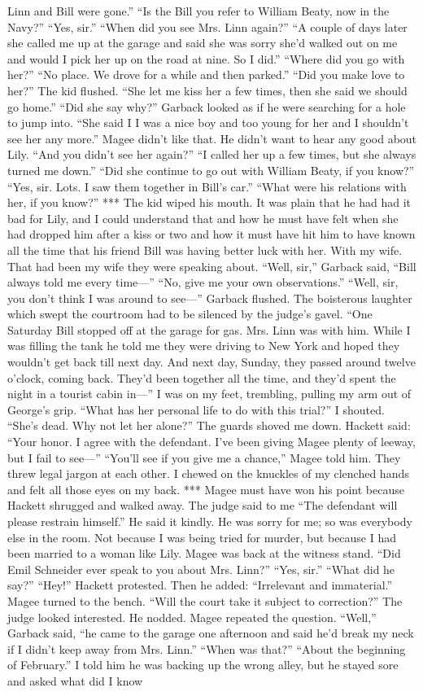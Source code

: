 \documentclass{novel}
\begin{document}
Linn and Bill were gone.” “Is the Bill you refer to William Beaty, now in the Navy?” “Yes, sir.” “When did you see Mrs. Linn again?” “A couple of days later she called me up at the garage and said she was sorry she’d walked out on me and would I pick her up on the road at nine. So I did.” “Where did you go with her?” “No place. We drove for a while and then parked.” “Did you make love to her?” The kid flushed. “She let me kiss her a few times, then she said we should go home.” “Did she say why?” Garback looked as if he were searching for a hole to jump into. “She said I I was a nice boy and too young for her and I shouldn’t see her any more.” Magee didn’t like that. He didn’t want to hear any good about Lily. “And you didn’t see her again?” “I called her up a few times, but she always turned me down.” “Did she continue to go out with William Beaty, if you know?” “Yes, sir. Lots. I saw them together in Bill’s car.” “What were his relations with her, if you know?” *** The kid wiped his mouth. It was plain that he had had it bad for Lily, and I could understand that and how he must have felt when she had dropped him after a kiss or two and how it must have hit him to have known all the time that his friend Bill was having better luck with her. With my wife. That had been my wife they were speaking about. “Well, sir,” Garback said, “Bill always told me every time—” “No, give me your own observations.” “Well, sir, you don’t think I was around to see—” Garback flushed. The boisterous laughter which swept the courtroom had to be silenced by the judge’s gavel. “One Saturday Bill stopped off at the garage for gas. Mrs. Linn was with him. While I was filling the tank he told me they were driving to New York and hoped they wouldn’t get back till next day. And next day, Sunday, they passed around twelve o’clock, coming back. They’d been together all the time, and they’d spent the night in a tourist cabin in—” I was on my feet, trembling, pulling my arm out of George’s grip. “What has her personal life to do with this trial?” I shouted. “She’s dead. Why not let her alone?” The guards shoved me down. Hackett said: “Your honor. I agree with the defendant. I’ve been giving Magee plenty of leeway, but I fail to see—” “You’ll see if you give me a chance,” Magee told him. They threw legal jargon at each other. I chewed on the knuckles of my clenched hands and felt all those eyes on my back. *** Magee must have won his point because Hackett shrugged and walked away. The judge said to me “The defendant will please restrain himself.” He said it kindly. He was sorry for me; so was everybody else in the room. Not because I was being tried for murder, but because I had been married to a woman like Lily. Magee was back at the witness stand. “Did Emil Schneider ever speak to you about Mrs. Linn?” “Yes, sir.” “What did he say?” “Hey!” Hackett protested. Then he added: “Irrelevant and immaterial.” Magee turned to the bench. “Will the court take it subject to correction?” The judge looked interested. He nodded. Magee repeated the question. “Well,” Garback said, “he came to the garage one afternoon and said he’d break my neck if I didn’t keep away from Mrs. Linn.” “When was that?” “About the beginning of February.” I told him he was backing up the wrong alley, but he stayed sore and asked what did I know 
\end{document}
